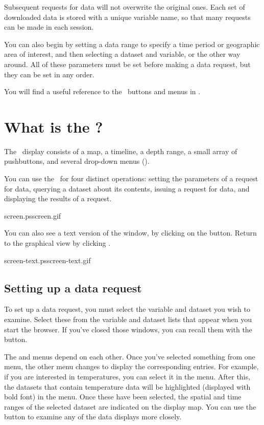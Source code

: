 Subsequent requests for data will not overwrite the original ones.
Each set of downloaded data is stored with a unique \matlab variable
name, so that many requests can be made in each \matlab session.

You can also begin by setting a data range to specify a time period or
geographic area of interest, and then selecting a dataset and
variable, or the other way around.  All of these parameters must be
set before making a data request, but they can be set in any order.

You will find a useful reference to the \GUI\ buttons and menus in
.

\section{What is the \GUI ?}
\label{gui,intro,intro}

The \GUI\ display consists of a map, a timeline, a depth
range, a small array of pushbuttons, and several drop-down menus
().

You can use the \GUI\ for four distinct operations:
setting the parameters of a request for data, querying a dataset about
its contents, issuing a request for data, and displaying the results
of a request.

{screen.ps}{screen.gif}{}

You can also see a text version of the window, by clicking on the
 button.  Return to the graphical view by clicking
.

{screen-text.ps}{screen-text.gif}{}

\subsection{Setting up a data request}

To set up a data request, you must select the variable and dataset you
wish to examine.  Select these from the variable and dataset lists
that appear when you start the browser.  If you've closed those
windows, you can recall them with the 
button. 

  The
 and  menus depend on each other.
Once you've selected something from one menu, the other menu changes
to display the corresponding entries. For example, if you are
interested in temperatures, you can select it in the
 menu.  After this, the datasets that contain
temperature data will be highlighted (displayed with bold font) in the
 menu. Once these have been selected, the spatial
and time ranges of the selected dataset are indicated on the display
map. You can use the  button to examine any of the data
displays more closely.

